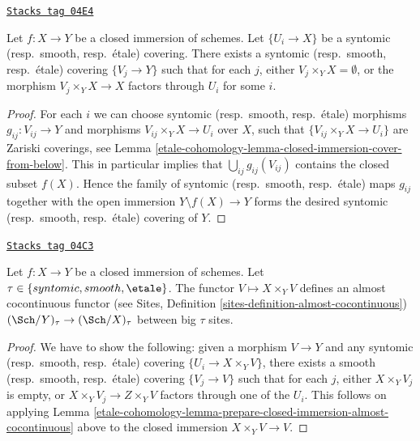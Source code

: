 \begin{lemma}
\label{etale-cohomology-lemma-prepare-closed-immersion-almost-cocontinuous}
\href{https://stacks.math.columbia.edu/tag/04E4}{\texttt{Stacks tag 04E4}}

Let $f : X \to Y$ be a closed immersion of schemes.
Let $\{U_i \to X\}$ be a syntomic (resp.\ smooth, resp.\ \'etale) covering.
There exists a syntomic (resp.\ smooth, resp.\ \'etale) covering $\{V_j \to Y\}$
such that for each $j$, either $V_j \times_Y X = \emptyset$, or the
morphism $V_j \times_Y X \to X$ factors through $U_i$ for some $i$.
\end{lemma}

\begin{proof}
For each $i$ we can choose syntomic (resp.\ smooth, resp.\ \'etale) morphisms
$g_{ij} : V_{ij} \to Y$ and morphisms $V_{ij} \times_Y X \to U_i$ over $X$,
such that $\{V_{ij} \times_Y X \to U_i\}$ are Zariski coverings, see
Lemma \ref{etale-cohomology-lemma-closed-immersion-cover-from-below}.
This in particular implies that
$\bigcup_{ij} g_{ij}(V_{ij})$ contains the closed subset $f(X)$.
Hence the family of syntomic (resp.\ smooth, resp.\ \'etale) maps $g_{ij}$
together with the open immersion $Y \setminus f(X) \to Y$ forms the desired
syntomic (resp.\ smooth, resp.\ \'etale) covering of $Y$.
\end{proof}

\begin{lemma}
\label{etale-cohomology-lemma-closed-immersion-almost-cocontinuous}
\href{https://stacks.math.columbia.edu/tag/04C3}{\texttt{Stacks tag 04C3}}

Let $f : X \to Y$ be a closed immersion of schemes.
Let $\tau \in \{syntomic, smooth, \etale\}$.
The functor $V \mapsto X \times_Y V$ defines an almost
cocontinuous functor (see
Sites, Definition \ref{sites-definition-almost-cocontinuous})
$(\Sch/Y)_\tau \to (\Sch/X)_\tau$ between
big $\tau$ sites.
\end{lemma}

\begin{proof}
We have to show the following: given a morphism $V \to Y$
and any syntomic (resp.\ smooth, resp.\ \'etale)
covering $\{U_i \to X \times_Y V\}$, there exists a
smooth (resp.\ smooth, resp.\ \'etale) covering $\{V_j \to V\}$
such that for each $j$, either $X \times_Y V_j$ is empty, or
$X \times_Y V_j \to Z \times_Y V$ factors through one of
the $U_i$. This follows on applying
Lemma \ref{etale-cohomology-lemma-prepare-closed-immersion-almost-cocontinuous}
above to the closed immersion $X \times_Y V \to V$.
\end{proof}

